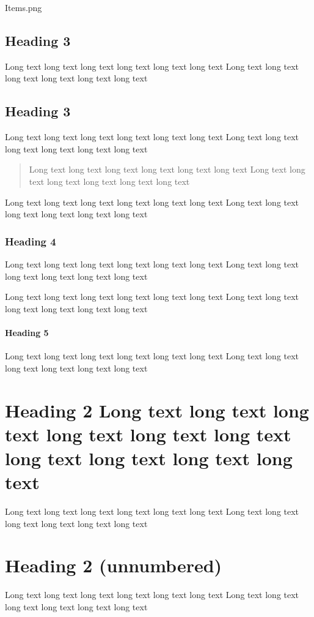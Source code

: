 \documentclass{akabook}
\theoremstyle{definition}
\begin{document}
Items.png

\subsection{Heading 3}
Long text long text long text long text long text long text
Long text long text long text long text long text long text
\subsection{Heading 3}
Long text long text long text long text long text long text
Long text long text long text long text long text long text
\begin{quote}
Long text long text long text long text long text long text
Long text long text long text long text long text long text
\end{quote}
Long text long text long text long text long text long text
Long text long text long text long text long text long text

\subsubsection{Heading 4}
Long text long text long text long text long text long text
Long text long text long text long text long text long text

Long text long text long text long text long text long text
Long text long text long text long text long text long text

\paragraph{Heading 5}
Long text long text long text long text long text long text
Long text long text long text long text long text long text

\section{Heading 2 Long text long text long text long text long  text long text long text long text long text long text}

Long text long text long text long text long text long text
Long text long text long text long text long text long text

\section*{Heading 2 (unnumbered)}
Long text long text long text long text long text long text
Long text long text long text long text long text long text
\end{document}

